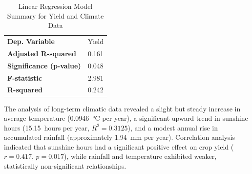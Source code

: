 \begin{table}[htbp]
    \centering
    \caption{Linear Regression Model Summary for Yield and Climate Data}
    \label{tab:reg_summary_climate_yield}
    \begin{tabular}{@{}lc@{}}
        \toprule
        \textbf{Dep. Variable} & Yield \\
        \textbf{Adjusted R-squared} & 0.161 \\
        \textbf{Significance (p-value)} & 0.048 \\
        \textbf{F-statistic} & 2.981 \\
        \textbf{R-squared} & 0.242 \\
        \bottomrule
    \end{tabular}
\end{table}

\begin{table}[htbp]
    \centering
    \caption{Regression Coefficients for Yield and Climate Data}
    \label{tab:reg_coef_climate_yield}
\end{table}

The analysis of long-term climatic data revealed a slight but steady increase in average temperature (0.0946~°C per year), a significant upward trend in sunshine hours (15.15~hours per year, $R^2 = 0.3125$), and a modest annual rise in accumulated rainfall (approximately 1.94~mm per year). Correlation analysis indicated that sunshine hours had a significant positive effect on crop yield ($r = 0.417$, $p = 0.017$), while rainfall and temperature exhibited weaker, statistically non-significant relationships.

